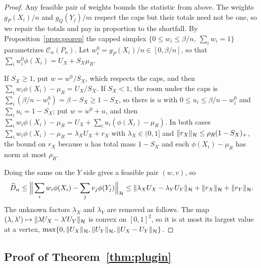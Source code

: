 \begin{proof}
Any feasible pair of weights bounds the statistic from above. The weights $g_P(X_i)/n$ and $g_Q(Y_j)/m$ respect the
caps but their totals need not be one, so we repair the totals and pay in proportion to the shortfall. By
Proposition~\ref{prop:georep} the capped simplex $\{0\le w_i\le\beta/n,\ \sum_iw_i=1\}$ parametrizes
$\mathcal C_\alpha(P_n)$. Let $w^0_i=g_P(X_i)/n\in[0,\beta/n]$, so that $\sum_iw^0_i\phi(X_i)=U_X+S_X\mu_R$.

If $S_X\ge1$, put $w=w^0/S_X$, which respects the caps, and then $\sum_iw_i\phi(X_i)-\mu_R=U_X/S_X$. If $S_X<1$, the
room under the caps is $\sum_i(\beta/n-w^0_i)=\beta-S_X\ge1-S_X$, so there is $u$ with $0\le u_i\le\beta/n-w^0_i$ and
$\sum_iu_i=1-S_X$; put $w=w^0+u$, and then $\sum_iw_i\phi(X_i)-\mu_R=U_X+\sum_iu_i(\phi(X_i)-\mu_R)$. In both cases
$\sum_iw_i\phi(X_i)-\mu_R=\lambda_XU_X+r_X$ with $\lambda_X\in(0,1]$ and $\|r_X\|_{\mathcal{H}}\le\rho_R(1-S_X)_+$, the bound on
$r_X$ because $u$ has total mass $1-S_X$ and each $\phi(X_i)-\mu_R$ has norm at most $\rho_R$.

Doing the same on the $Y$ side gives a feasible pair $(w,v)$, so
\[
\widehat D_\alpha\le\Big\|\sum_iw_i\phi(X_i)-\sum_jv_j\phi(Y_j)\Big\|_{\mathcal{H}}\le\|\lambda_XU_X-\lambda_YU_Y\|_{\mathcal{H}}+\|r_X\|_{\mathcal{H}}
+\|r_Y\|_{\mathcal{H}} .
\]
The unknown factors $\lambda_X$ and $\lambda_Y$ are removed as follows. The map
$(\lambda,\lambda')\mapsto\|\lambda U_X-\lambda'U_Y\|_{\mathcal{H}}$ is convex on $[0,1]^2$, so it is at most its largest value at a
vertex, $\max\{0,\|U_X\|_{\mathcal{H}},\|U_Y\|_{\mathcal{H}},\|U_X-U_Y\|_{\mathcal{H}}\}$.
\end{proof}

\subsection{Proof of Theorem~\ref{thm:plugin}}

